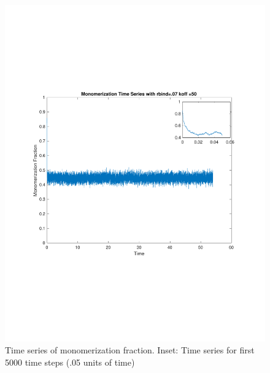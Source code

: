 \documentclass{article}
\begin{document}
\begin{figure}[]
\centering
\includegraphics[scale=0.5]{timeSeries.pdf}
\caption{Time series of monomerization fraction. Inset: Time series for first 5000 time steps (.05 units of time)}
\label{fig:timeSeries}
\end{figure}
\end{document}
